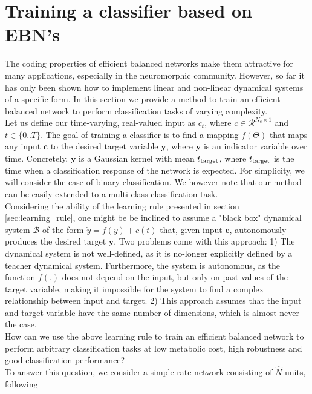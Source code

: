 \documentclass[twoside,11pt,titlepage]{article}
\begin{document}
\section{Training a classifier based on EBN's}
The coding properties of efficient balanced networks make them attractive for many applications, especially in the neuromorphic community. However, so far it has only been shown how to
implement linear and non-linear dynamical systems of a specific form. In this section we provide a method to train an efficient balanced network to perform classification tasks of varying
complexity. \\
Let us define our time-varying, real-valued input as $c_t$, where $c \in \mathcal{R}^{N_c \times 1}$ and $t \in \{0..T\}$.
The goal of training a classifier is to find a mapping $f(\Theta)$ that maps any input $\mathbf{c}$ to the desired target variable $\mathbf{y}$,
where $\mathbf{y}$ is an indicator variable over time. Concretely, $\mathbf{y}$ is a Gaussian kernel with mean $t_\textnormal{target}$, where $t_\textnormal{target}$
is the time when a classification response of the network is expected.
For simplicity, we will consider the case of binary classification. We however note that our method can be easily extended to a multi-class classification task. \\
Considering the ability of the learning rule presented in section \ref{sec:learning_rule}, one might be be inclined to assume a "black box" dynamical system $\mathcal{B}$
of the form $\dot{y} = f(y) + c(t)$ that, given input $\mathbf{c}$, autonomously produces the desired target $\mathbf{y}$. Two problems come with this approach:
1) The dynamical system is not well-defined, as it is no-longer explicitly defined by a teacher dynamical system. Furthermore, the system is autonomous, as the function
$f(.)$ does not depend on the input, but only on past values of the target variable, making it impossible for the system to find a complex relationship between input and target.
2) This approach assumes that the input and target variable have the same number of dimensions,
which is almost never the case. \\
How can we use the above learning rule to train an efficient balanced network to perform arbitrary classification tasks at low metabolic cost, high robustness and good classification performance? \\
To answer this question, we consider a simple rate network consisting of $\hat{N}$ units, following
\end{document}
